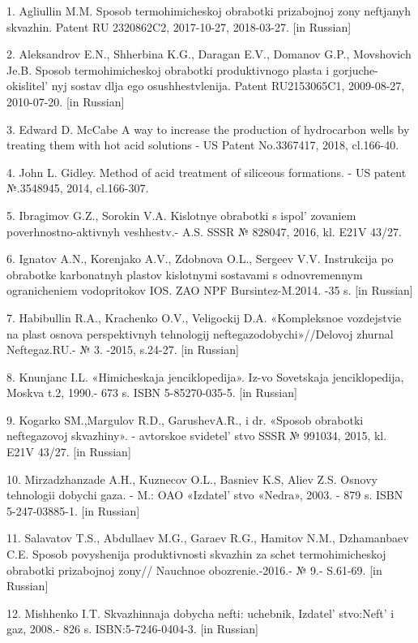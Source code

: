 \begin{refs}
1. Agliullin M.M. Sposob termohimicheskoj obrabotki prizabojnoj zony
neftjanyh skvazhin. Patent RU 2320862C2, 2017-10-27, 2018-03-27. {[}in
Russian{]}

2. Aleksandrov E.N., Shherbina K.G., Daragan E.V., Domanov G.P.,
Movshovich Je.B. Sposob termo\-himicheskoj obrabotki produktivnogo plasta
i gorjuche-okislitel' nyj sostav dlja ego
osushhestvlenija. Patent RU2153065C1, 2009-08-27, 2010-07-20. {[}in
Russian{]}

3. Edward D. McCabe A way to increase the production of hydrocarbon
wells by treating them with hot acid solutions - US Patent No.3367417,
2018, cl.166-40.

4. John L. Gidley. Method of acid treatment of siliceous formations. -
US patent №.3548945, 2014, cl.166-307.

5. Ibragimov G.Z., Sorokin V.A. Kislotnye obrabotki s
ispol' zovaniem poverhnostno-aktivnyh veshhestv.- A.S.
SSSR № 828047, 2016, kl. E21V 43/27.

6. Ignatov A.N., Korenjako A.V., Zdobnova O.L., Sergeev V.V. Instrukcija
po obrabotke karbonatnyh plastov kislotnymi sostavami s odnovremennym
ogranicheniem vodopritokov IOS. ZAO NPF Bursintez-M.2014. -35 s. {[}in
Russian{]}

7. Habibullin R.A., Krachenko O.V., Veligockij D.A. «Kompleksnoe
vozdejstvie na plast osnova perspekt\-ivnyh tehnologij
neftegazodobychi»//Delovoj zhurnal Neftegaz.RU.- № 3. -2015, s.24-27.
{[}in Russian{]}

8. Knunjanc I.L. «Himicheskaja jenciklopedija». Iz-vo Sovetskaja
jenciklopedija, Moskva t.2, 1990.- 673 s. ISBN 5-85270-035-5. {[}in
Russian{]}

9. Kogarko SM.,Margulov R.D., GarushevA.R., i dr. «Sposob obrabotki
neftegazovoj skvazhiny». - avtor\-skoe svidetel' stvo SSSR
№ 991034, 2015, kl. E21V 43/27. {[}in Russian{]}

10. Mirzadzhanzade A.H., Kuznecov O.L., Basniev K.S, Aliev Z.S. Osnovy
tehnologii dobychi gaza. - M.: OAO «Izdatel' stvo
«Nedra», 2003. - 879 s. ISBN 5-247-03885-1. {[}in Russian{]}

11. Salavatov T.S., Abdullaev M.G., Garaev R.G., Hamitov N.M.,
Dzhamanbaev C.E. Sposob povyshenija produktivnosti skvazhin za schet
termohimicheskoj obrabotki prizabojnoj zony// Nauchnoe obozrenie.-2016.-
№ 9.- S.61-69. {[}in Russian{]}

12. Mishhenko I.T. Skvazhinnaja dobycha nefti: uchebnik,
Izdatel' stvo:Neft'{} i gaz, 2008.- 826 s.
ISBN:5-7246-0404-3. {[}in Russian{]}


\end{refs}
